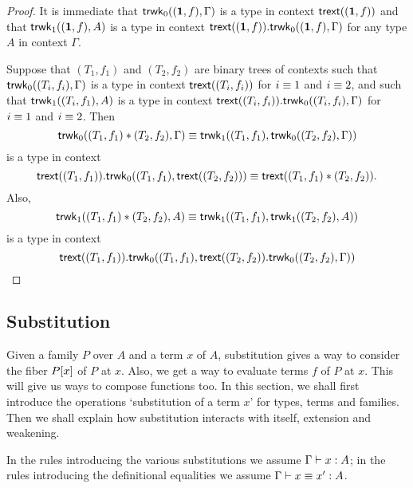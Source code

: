 \begin{proof}
It is immediate that $\mathsf{trwk}_0((\mathbf{1},f),\Gamma)$ is a type in context $\mathsf{trext}((\mathbf{1},f))$
and that $\mathsf{trwk}_1((\mathbf{1},f),A)$ is a type in context $\ctxext{\trext((\unit,f))}
{\trwk_0((\unit,f),\Gamma)}$ for any type $A$ in context $\Gamma$.

Suppose that $(T_1,f_1)$ and $(T_2,f_2)$ are binary trees of contexts such that
$\mathsf{trwk}_0((T_i,f_i),\Gamma)$ is a type in context
$\mathsf{trext}((T_i,f_i))$ for $i\equiv 1$ and $i\equiv 2$, and such that
$\mathsf{trwk}_1((T_i,f_1),A)$ is a type in context $\ctxext{\trext((T_i,f_i))}{\trwk_0((T_i,f_i),\Gamma)}$
for $i\equiv 1$ and $i\equiv 2$. Then
\begin{equation*}
\mathsf{trwk}_0((T_1,f_1)*(T_2,f_2),\Gamma) 
\equiv \mathsf{trwk}_1((T_1,f_1),\mathsf{trwk}_0((T_2,f_2),\Gamma))
\end{equation*}
is a type in context
\begin{equation*}
\ctxext{\trext((T_1,f_1))}{\trwk_0((T_1,f_1),\trext((T_2,f_2)))}
\jdeq \trext((T_1,f_1)*(T_2,f_2)).
\end{equation*}
Also,
\begin{equation*}
\mathsf{trwk}_1((T_1,f_1)*(T_2,f_2),A) \equiv \mathsf{trwk}_1((T_1,f_1),\mathsf{trwk}_1((T_2,f_2),A))
\end{equation*}
is a type in context
\begin{equation*}
\ctxext{\trext((T_1,f_1))}{\trwk_0((T_1,f_1),\ctxext{\trext((T_2,f_2))}{\trwk_0((T_2,f_2),\Gamma))}}
\end{equation*}
\end{proof}

\subsection{Substitution}
Given a family $P$ over $A$ and a term $x$ of $A$, substitution gives a way to
consider the fiber $\subst{x}{P}$ of $P$ at $x$. Also, we get a way to evaluate
terms $f$ of $P$ at $x$. This will give us ways to compose functions too. In
this section, we shall first introduce the operations `substitution of a term $x$'
for types, terms and families. Then we shall explain how substitution interacts
with itself, extension and weakening.

In the rules introducing the various substitutions we assume $\jterm{\Gamma}{A}{x}$;
in the rules introducing the definitional equalities we assume $\jtermeq{\Gamma}{A}{x}{x'}$.

